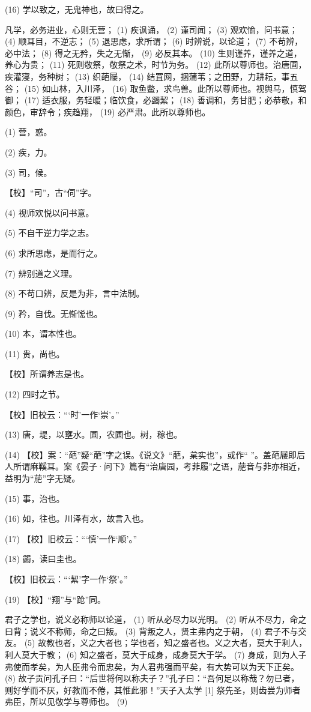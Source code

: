 \documentclass[12pt,UTF8]{ctexbook}
\begin{document}
(16) 学以致之，无鬼神也，故曰得之。

凡学，必务进业，心则无营； (1) 疾讽诵， (2) 谨司闻； (3) 观欢愉，问书意； (4) 顺耳目，不逆志； (5) 退思虑，求所谓； (6) 时辨说，以论道； (7) 不苟辨，必中法； (8) 得之无矜，失之无惭， (9) 必反其本。 (10) 生则谨养，谨养之道，养心为贵； (11) 死则敬祭，敬祭之术，时节为务。 (12) 此所以尊师也。治唐圃，疾灌寖，务种树； (13) 织葩屦， (14) 结罝网，捆蒲苇；之田野，力耕耘，事五谷； (15) 如山林，入川泽， (16) 取鱼鳖，求鸟兽。此所以尊师也。视舆马，慎驾御； (17) 适衣服，务轻暖；临饮食，必蠲絜； (18) 善调和，务甘肥；必恭敬，和颜色，审辞令；疾趋翔， (19) 必严肃。此所以尊师也。

(1) 营，惑。

(2) 疾，力。

(3) 司，候。

【校】“司”，古“伺”字。

(4) 视师欢悦以问书意。

(5) 不自干逆力学之志。

(6) 求所思虑，是而行之。

(7) 辨别道之义理。

(8) 不苟口辨，反是为非，言中法制。

(9) 矜，自伐。无惭恡也。

(10) 本，谓本性也。

(11) 贵，尚也。

【校】所谓养志是也。

(12) 四时之节。

【校】旧校云：“‘时’一作‘崇’。”

(13) 唐，堤，以壅水。圃，农圃也。树，稼也。

(14) 【校】案：“葩”疑“萉”字之误。《说文》“萉，枲实也”，或作“ ”。盖葩屦即后人所谓麻鞵耳。案《晏子·问下》篇有“治唐园，考菲履”之语，萉音与菲亦相近，益明为“萉”字无疑。

(15) 事，治也。

(16) 如，往也。川泽有水，故言入也。

(17) 【校】旧校云：“‘慎’一作‘顺’。”

(18) 蠲，读曰圭也。

【校】旧校云：“‘絜’字一作‘祭’。”

(19) 【校】“翔”与“跄”同。

君子之学也，说义必称师以论道， (1) 听从必尽力以光明。 (2) 听从不尽力，命之曰背；说义不称师，命之曰叛。 (3) 背叛之人，贤主弗内之于朝， (4) 君子不与交友。 (5) 故教也者，义之大者也；学也者，知之盛者也。义之大者，莫大于利人，利人莫大于教； (6) 知之盛者，莫大于成身，成身莫大于学。 (7) 身成，则为人子弗使而孝矣，为人臣弗令而忠矣，为人君弗强而平矣，有大势可以为天下正矣。 (8) 故子贡问孔子曰：“后世将何以称夫子？”孔子曰：“吾何足以称哉？勿已者，则好学而不厌，好教而不倦，其惟此邪！”天子入太学 [1] 祭先圣，则齿尝为师者弗臣，所以见敬学与尊师也。 (9)
\end{document}
